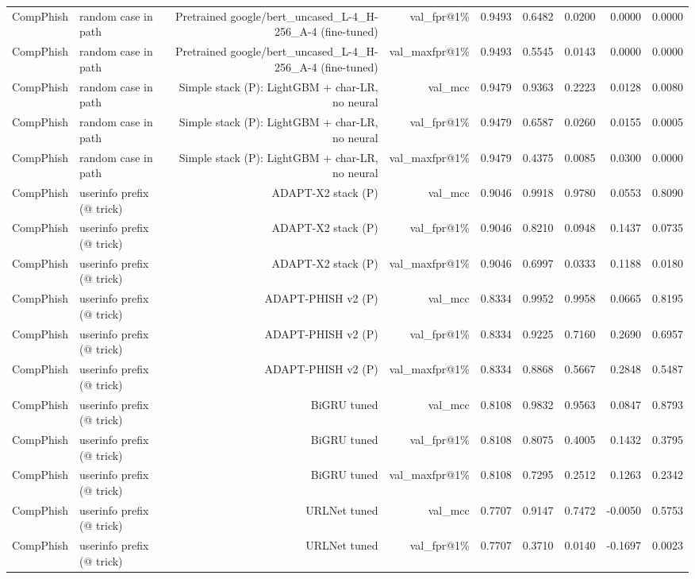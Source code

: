 \begin{table}[t]
\begin{tabular}{llrrrrrrr}
CompPhish & random case in path & Pretrained google/bert\_uncased\_L-4\_H-256\_A-4 (fine-tuned) & val\_fpr@1\% & 0.9493 & 0.6482 & 0.0200 & 0.0000 & 0.0000 \\
CompPhish & random case in path & Pretrained google/bert\_uncased\_L-4\_H-256\_A-4 (fine-tuned) & val\_maxfpr@1\% & 0.9493 & 0.5545 & 0.0143 & 0.0000 & 0.0000 \\
CompPhish & random case in path & Simple stack (P): LightGBM + char-LR, no neural & val\_mcc & 0.9479 & 0.9363 & 0.2223 & 0.0128 & 0.0080 \\
CompPhish & random case in path & Simple stack (P): LightGBM + char-LR, no neural & val\_fpr@1\% & 0.9479 & 0.6587 & 0.0260 & 0.0155 & 0.0005 \\
CompPhish & random case in path & Simple stack (P): LightGBM + char-LR, no neural & val\_maxfpr@1\% & 0.9479 & 0.4375 & 0.0085 & 0.0300 & 0.0000 \\
CompPhish & userinfo prefix (@ trick) & ADAPT-X2 stack (P) & val\_mcc & 0.9046 & 0.9918 & 0.9780 & 0.0553 & 0.8090 \\
CompPhish & userinfo prefix (@ trick) & ADAPT-X2 stack (P) & val\_fpr@1\% & 0.9046 & 0.8210 & 0.0948 & 0.1437 & 0.0735 \\
CompPhish & userinfo prefix (@ trick) & ADAPT-X2 stack (P) & val\_maxfpr@1\% & 0.9046 & 0.6997 & 0.0333 & 0.1188 & 0.0180 \\
CompPhish & userinfo prefix (@ trick) & ADAPT-PHISH v2 (P) & val\_mcc & 0.8334 & 0.9952 & 0.9958 & 0.0665 & 0.8195 \\
CompPhish & userinfo prefix (@ trick) & ADAPT-PHISH v2 (P) & val\_fpr@1\% & 0.8334 & 0.9225 & 0.7160 & 0.2690 & 0.6957 \\
CompPhish & userinfo prefix (@ trick) & ADAPT-PHISH v2 (P) & val\_maxfpr@1\% & 0.8334 & 0.8868 & 0.5667 & 0.2848 & 0.5487 \\
CompPhish & userinfo prefix (@ trick) & BiGRU tuned & val\_mcc & 0.8108 & 0.9832 & 0.9563 & 0.0847 & 0.8793 \\
CompPhish & userinfo prefix (@ trick) & BiGRU tuned & val\_fpr@1\% & 0.8108 & 0.8075 & 0.4005 & 0.1432 & 0.3795 \\
CompPhish & userinfo prefix (@ trick) & BiGRU tuned & val\_maxfpr@1\% & 0.8108 & 0.7295 & 0.2512 & 0.1263 & 0.2342 \\
CompPhish & userinfo prefix (@ trick) & URLNet tuned & val\_mcc & 0.7707 & 0.9147 & 0.7472 & -0.0050 & 0.5753 \\
CompPhish & userinfo prefix (@ trick) & URLNet tuned & val\_fpr@1\% & 0.7707 & 0.3710 & 0.0140 & -0.1697 & 0.0023 \\

\end{tabular}
\end{table}
